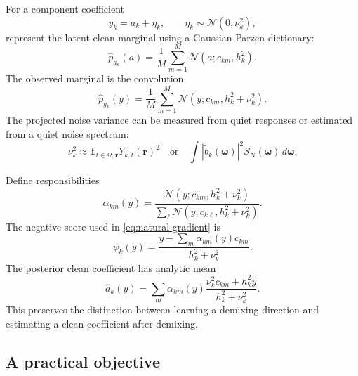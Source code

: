 \documentclass[11pt]{article}
\newcommand{\E}{\mathbb{E}}
\begin{document}
For a component coefficient
\begin{equation}
y_{k}=a_k+\eta_k,\qquad
\eta_k\sim\mathcal N(0,\nu_k^2),
\end{equation}
represent the latent clean marginal using a Gaussian Parzen dictionary:
\begin{equation}
\widehat p_{a_k}(a)
=
\frac1M\sum_{m=1}^{M}
\mathcal N(a;c_{km},h_k^2).
\end{equation}
The observed marginal is the convolution
\begin{equation}
\widehat p_{y_k}(y)
=
\frac1M\sum_{m=1}^{M}
\mathcal N
\left(y;c_{km},h_k^2+\nu_k^2\right).
\label{eq:noisy-parzen}
\end{equation}
The projected noise variance can be measured from quiet responses or estimated
from a quiet noise spectrum:
\begin{equation}
\nu_k^2
\approx
\E_{t\in\mathcal Q,\bm r}Y_{k,t}(\bm r)^2
\quad\text{or}\quad
\int |\widetilde b_k(\bm\omega)|^2
S_N(\bm\omega)\,d\bm\omega.
\end{equation}

Define responsibilities
\begin{equation}
\alpha_{km}(y)
=
\frac{
\mathcal N(y;c_{km},h_k^2+\nu_k^2)
}{
\sum_{\ell}
\mathcal N(y;c_{k\ell},h_k^2+\nu_k^2)
}.
\end{equation}
The negative score used in \cref{eq:natural-gradient} is
\begin{equation}
\psi_k(y)
=
\frac{
y-\sum_m\alpha_{km}(y)c_{km}
}{
h_k^2+\nu_k^2
}.
\label{eq:parzen-score}
\end{equation}
The posterior clean coefficient has analytic mean
\begin{equation}
\widehat a_k(y)
=
\sum_m\alpha_{km}(y)
\frac{
\nu_k^2c_{km}+h_k^2y
}{
h_k^2+\nu_k^2
}.
\label{eq:parzen-posterior}
\end{equation}
This preserves the distinction between learning a demixing direction and
estimating a clean coefficient after demixing.

\subsection{A practical objective}
\end{document}
